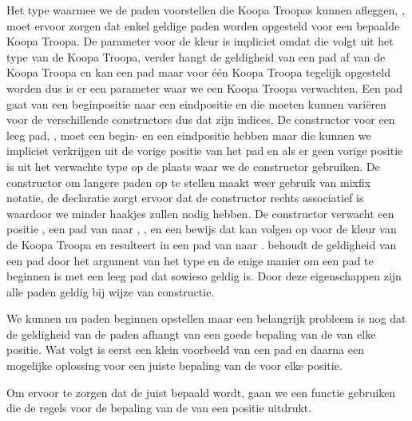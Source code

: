 
Het type waarmee we de paden voorstellen die Koopa Troopas kunnen afleggen,
, moet ervoor zorgen dat enkel geldige paden worden opgesteld voor
een bepaalde Koopa Troopa. De parameter voor de kleur is impliciet omdat die
volgt uit het type van de Koopa Troopa, verder hangt de geldigheid van een pad
af van de Koopa Troopa en kan een pad maar voor één Koopa Troopa tegelijk
opgesteld worden dus is er een parameter waar we een Koopa Troopa verwachten.
Een pad gaat van een beginpositie naar een eindpositie en die moeten kunnen
variëren voor de verschillende constructors dus dat zijn indices. De
constructor voor een leeg pad, \iagda{[]}, moet een begin- en een eindpositie
hebben maar die kunnen we impliciet verkrijgen uit de vorige positie van het
pad en als er geen vorige positie is uit het verwachte type op de plaats waar
we de constructor gebruiken. De constructor om langere paden op te stellen
maakt weer gebruik van mixfix notatie, de  declaratie zorgt
ervoor dat de constructor rechts associatief is waardoor we minder haakjes
zullen nodig hebben. De constructor verwacht een positie , een pad van
 naar , , en een bewijs dat  kan volgen op
 voor de kleur van de Koopa Troopa en resulteert in een pad van
 naar .  behoudt de geldigheid van een pad door
het argument van het type  en de enige manier om een pad te
beginnen is met een leeg pad dat sowieso geldig is. Door deze eigenschappen
zijn alle paden geldig bij wijze van constructie.

We kunnen nu paden beginnen opstellen maar een belangrijk probleem is nog dat
de geldigheid van de paden afhangt van een goede bepaling van de
 van elke positie. Wat volgt is eerst een klein voorbeeld van
een pad en daarna een mogelijke oplossing voor een juiste bepaling van de
 voor elke positie.


Om ervoor te zorgen dat de  juist bepaald wordt, gaan we
een functie gebruiken die de regels voor de bepaling van de 
van een positie uitdrukt.


